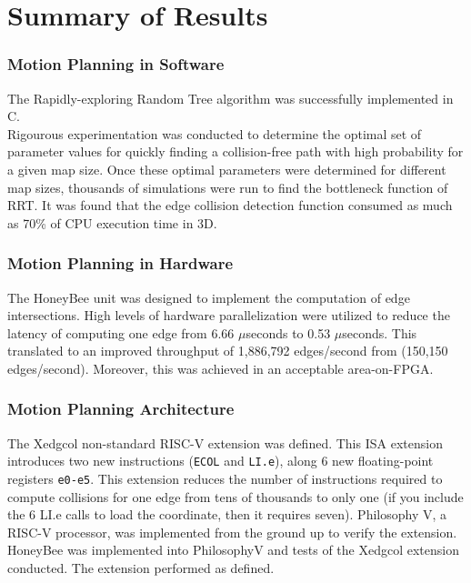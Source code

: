 
\section{Summary of Results}
    \subsubsection{Motion Planning in Software}
        The Rapidly-exploring Random Tree algorithm was successfully implemented in C. \\Rigourous experimentation was conducted to determine the optimal set of parameter values for quickly finding a collision-free path with high probability for a given map size. Once these optimal parameters were determined for different map sizes, thousands of simulations were run to find the bottleneck function of \gls{RRT}. It was found that the edge collision detection function consumed as much as 70\% of CPU execution time in \gls{3D}.

    \subsubsection{Motion Planning in Hardware}
        The HoneyBee unit was designed to implement the computation of edge intersections. High levels of hardware parallelization were utilized to reduce the latency of computing one edge from 6.66 $\mu$seconds to 0.53 $\mu$seconds. This translated to an improved throughput of 1,886,792 edges/second from (150,150 edges/second). Moreover, this was achieved in an acceptable area-on-FPGA.

    \subsubsection{Motion Planning Architecture}
        The Xedgcol non-standard RISC-V extension was defined. This ISA extension introduces two new instructions (\texttt{ECOL} and \texttt{LI.e}), along 6 new floating-point registers \texttt{e0-e5}. This extension reduces the number of instructions required to compute collisions for one edge from tens of thousands to only one (if you include the 6 LI.e calls to load the coordinate, then it requires seven). Philosophy V, a RISC-V processor, was implemented from the ground up to verify the extension. HoneyBee was implemented into PhilosophyV and tests of the Xedgcol extension conducted. The extension performed as defined.

